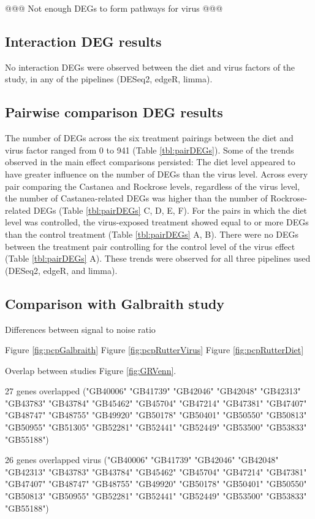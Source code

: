 \documentclass[11pt,a4paper,oldfontcommands,openany]{memoir}
\numberwithin{equation}{section} %
\begin{document}
@@@ Not enough DEGs to form pathways for virus @@@

\subsection{Interaction DEG results}

No interaction DEGs were observed between the diet and virus factors of the study, in any of the pipelines (DESeq2, edgeR, limma).

\subsection{Pairwise comparison DEG results}

The number of DEGs across the six treatment pairings between the diet and virus factor ranged from 0 to 941 (Table \ref{tbl:pairDEGs}). Some of the trends observed in the main effect comparisons persisted: The diet level appeared to have greater influence on the number of DEGs than the virus level. Across every pair comparing the Castanea and Rockrose levels, regardless of the virus level, the number of Castanea-related DEGs was higher than the number of Rockrose-related DEGs (Table \ref{tbl:pairDEGs} C, D, E, F). For the pairs in which the diet level was controlled, the virus-exposed treatment showed equal to or more DEGs than the control treatment (Table \ref{tbl:pairDEGs} A, B). There were no DEGs between the treatment pair controlling for the control level of the virus effect (Table \ref{tbl:pairDEGs} A). These trends were observed for all three pipelines used (DESeq2, edgeR, and limma). 

\subsection{Comparison with Galbraith study}

Differences between signal to noise ratio

Figure \ref{fig:pcpGalbraith}
Figure \ref{fig:pcpRutterVirus}
Figure \ref{fig:pcpRutterDiet}

Overlap between studies Figure \ref{fig:GRVenn}.

27 genes overlapped ("GB40006" "GB41739" "GB42046" "GB42048" "GB42313" "GB43783" "GB43784" "GB45462" "GB45704" "GB47214" "GB47381" "GB47407" "GB48747" "GB48755" "GB49920" "GB50178" "GB50401" "GB50550" "GB50813" "GB50955" "GB51305" "GB52281" "GB52441" "GB52449" "GB53500" "GB53833" "GB55188")

26 genes overlapped virus ("GB40006" "GB41739" "GB42046" "GB42048" "GB42313" "GB43783" "GB43784" "GB45462" "GB45704" "GB47214" "GB47381" "GB47407" "GB48747" "GB48755" "GB49920" "GB50178" "GB50401" "GB50550" "GB50813" "GB50955" "GB52281" "GB52441" "GB52449" "GB53500" "GB53833" "GB55188")
\end{document}
